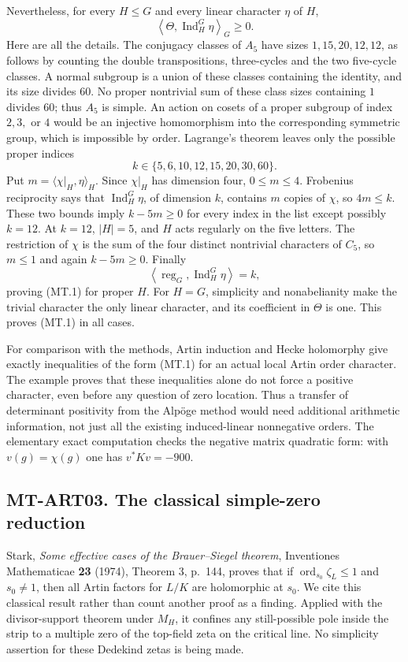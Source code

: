 \documentclass[11pt,a4paper]{article}
\begin{document}
Nevertheless, for every $H\le G$ and every linear character $\eta$ of $H$,
\[
       \left\langle\Theta,\operatorname{Ind}_H^G\eta\right\rangle_G
                    \ge0.                                      \tag{MT.1}
\]
Here are all the details.  The conjugacy classes of $A_5$ have sizes
$1,15,20,12,12$, as follows by counting the double transpositions,
three-cycles and the two five-cycle classes.  A normal subgroup is a union
of these classes containing the identity, and its size divides $60$.
No proper nontrivial sum of these class sizes containing $1$ divides $60$;
thus $A_5$ is simple.  An action on cosets of a proper subgroup of index
$2,3,$ or $4$ would be an injective homomorphism into the corresponding
symmetric group, which is impossible by order.  Lagrange's theorem leaves
only the possible proper indices
\[
                    k\in\{5,6,10,12,15,20,30,60\}.
\]
Put $m=\langle\chi|_H,\eta\rangle_H$.  Since $\chi|_H$ has dimension four,
$0\le m\le4$.  Frobenius reciprocity says that
$\operatorname{Ind}_H^G\eta$, of dimension $k$, contains $m$ copies of
$\chi$, so $4m\le k$.  These two bounds imply $k-5m\ge0$ for every index
in the list except possibly $k=12$.  At $k=12$, $|H|=5$, and $H$ acts
regularly on the five letters.  The restriction of $\chi$ is the sum of
the four distinct nontrivial characters of $C_5$, so $m\le1$ and again
$k-5m\ge0$.  Finally
\[
 \left\langle\operatorname{reg}_G,
       \operatorname{Ind}_H^G\eta\right\rangle=k,
\]
proving (MT.1) for proper $H$.  For $H=G$, simplicity and nonabelianity
make the trivial character the only linear character, and its coefficient
in $\Theta$ is one.  This proves (MT.1) in all cases.

For comparison with the methods, Artin induction and Hecke holomorphy
give exactly inequalities of the form (MT.1) for an actual local Artin
order character.  The example proves that these inequalities alone do not
force a positive character, even before any question of zero location.
Thus a transfer of determinant positivity from the Alp\"oge method would
need additional arithmetic information, not just all the existing
induced-linear nonnegative orders.  The elementary exact computation
 checks the negative matrix
quadratic form: with $v(g)=\chi(g)$ one has $v^*Kv=-900$.

\subsection*{MT-ART03. The classical simple-zero reduction}
Stark, \emph{Some effective cases of the Brauer--Siegel theorem},
Inventiones Mathematicae \textbf{23} (1974), Theorem 3, p.~144, proves
that if $\operatorname{ord}_{s_0}\zeta_L\le1$ and $s_0\ne1$, then all
Artin factors for $L/K$ are holomorphic at $s_0$.  We cite this classical
result rather than count another proof as a finding.  Applied with the
divisor-support theorem under $M_H$, it confines any still-possible pole
inside the strip to a multiple zero of the top-field zeta on the critical
line.  No simplicity assertion for these Dedekind zetas is being made.
\end{document}

